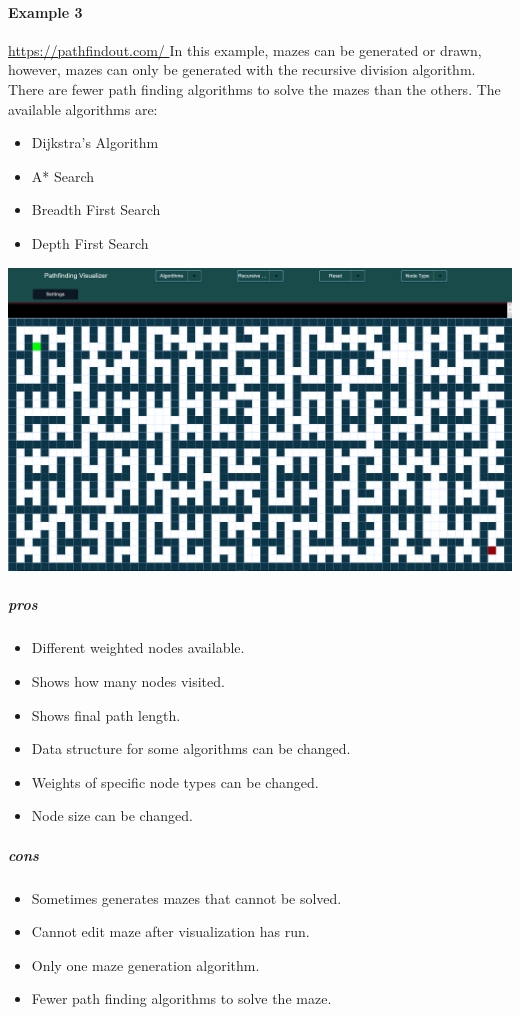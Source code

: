 \documentclass{article}
\begin{document}
\paragraph{Example 3}
\href{https://pathfindout.com/
}{https://pathfindout.com/
}
\newline
In this example, mazes can be generated or drawn, however, mazes can only be generated with the recursive division algorithm. There are fewer path finding algorithms to solve the mazes than the others. The available algorithms are:
\begin{itemize}
    \item Dijkstra's Algorithm
    \item A* Search
    \item Breadth First Search
    \item Depth First Search
\end{itemize}
\includegraphics[width=\linewidth]{assets/Existing Solutions/example 3.PNG}
\subparagraph*{pros}
\begin{itemize}
    \item Different weighted nodes available.
    \item Shows how many nodes visited.
    \item Shows final path length.
    \item Data structure for some algorithms can be changed.
    \item Weights of specific node types can be changed.
    \item Node size can be changed.
\end{itemize}
\subparagraph*{cons}
\begin{itemize}
    \item Sometimes generates mazes that cannot be solved.
    \item Cannot edit maze after visualization has run.
    \item Only one maze generation algorithm.
    \item Fewer path finding algorithms to solve the maze.
\end{itemize}
\end{document}
